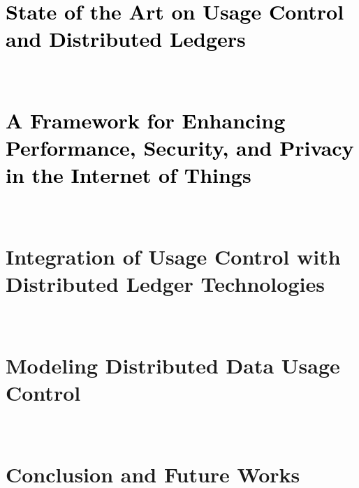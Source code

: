 \documentclass[a4paper,11pt,pagebackref=true]{report}
\newcommand{\rul}[2][red]{\textcolor{#1}{\ul{#2}}}
\renewcommand{\rul}[1][black]{\textcolor{#1}}
\begin{document}
\newpage \ \newpage
\chapter{\rul{State of the Art on Usage Control and Distributed Ledgers}}

\label{C_state_of_the_art}

\newpage \ \newpage

\chapter{\rul{A Framework for Enhancing Performance, Security, and Privacy in the Internet of Things}}
\label{C_solving_trilemma}


\newpage \ \newpage
\chapter{Integration of Usage Control with Distributed Ledger Technologies}
\label{C_integration}

\newpage \ \newpage

\chapter{Modeling Distributed Data Usage Control}
\label{C_formalism}


\newpage \ \newpage
\chapter{Conclusion and Future Works}
\label{C_conclusion}
 


% 
%  

 
\end{document}
